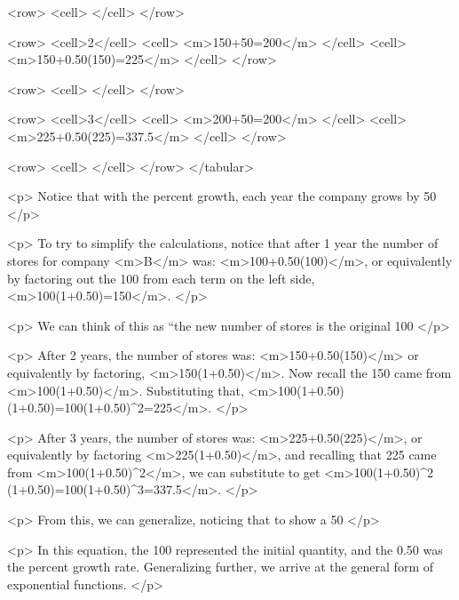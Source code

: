             <row>
                <cell> </cell>
            </row>

            <row>
                <cell>2</cell>
                <cell> <m>150+50=200</m> </cell>
                <cell> <m>150+0.50(150)=225</m> </cell>
            </row>

            <row>
                <cell> </cell>
            </row>

            <row>
                <cell>3</cell>
                <cell> <m>200+50=200</m> </cell>
                <cell> <m>225+0.50(225)=337.5</m> </cell>
            </row>

            <row>
                <cell> </cell>
            </row>
        </tabular>

        <p>
            Notice that with the percent growth, each year the company grows by 50%
        </p>

        <p>
            To try to simplify the calculations, notice that after 1 year the number of stores for company <m>B</m> was: <m>100+0.50(100)</m>, or equivalently by factoring out the 100 from each term on the left side, <m>100(1+0.50)=150</m>.
        </p>

        <p>
            We can think of this as “the new number of stores is the original 100%
        </p>

        <p>
            After 2 years, the number of stores was: <m>150+0.50(150)</m> or equivalently by factoring, <m>150(1+0.50)</m>.
            Now recall the 150 came from <m>100(1+0.50)</m>.
            Substituting that, <m>100(1+0.50)(1+0.50)=100(1+0.50)^{2}=225</m>.
        </p>

        <p>
            After 3 years, the number of stores was: <m>225+0.50(225)</m>, or equivalently by factoring <m>225(1+0.50)</m>, and recalling that 225 came from <m>100(1+0.50)^{2}</m>, we can substitute to get <m>100(1+0.50)^{2} (1+0.50)=100(1+0.50)^{3}=337.5</m>.
        </p>

        <p>
            From this, we can generalize, noticing that to show a 50%
        </p>

        <p>
            In this equation, the 100 represented the initial quantity, and the 0.50 was the percent growth rate.
            Generalizing further, we arrive at the general form of exponential functions.
        </p>

